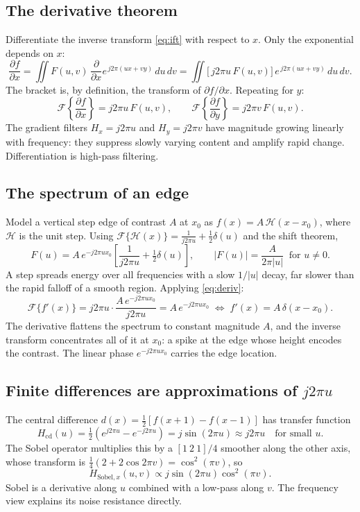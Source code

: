 \documentclass[11pt]{article}
\begin{document}
\subsection{The derivative theorem}
Differentiate the inverse transform \eqref{eq:ift} with respect to $x$. Only the exponential depends on $x$:
\[
\frac{\partial f}{\partial x}=\iint F(u,v)\,\frac{\partial}{\partial x}e^{\,j2\pi(ux+vy)}\,du\,dv
=\iint \big[\,j2\pi u\,F(u,v)\big]\,e^{\,j2\pi(ux+vy)}\,du\,dv .
\]
The bracket is, by definition, the transform of $\partial f/\partial x$. Repeating for $y$:
\begin{equation}
\mathcal{F}\!\left\{\frac{\partial f}{\partial x}\right\}=j2\pi u\,F(u,v),\qquad
\mathcal{F}\!\left\{\frac{\partial f}{\partial y}\right\}=j2\pi v\,F(u,v). \label{eq:deriv}
\end{equation}
The gradient filters $H_x=j2\pi u$ and $H_y=j2\pi v$ have magnitude growing linearly with frequency: they suppress slowly varying content and amplify rapid change. Differentiation is high-pass filtering.

\subsection{The spectrum of an edge}
Model a vertical step edge of contrast $A$ at $x_0$ as $f(x)=A\,\mathcal{H}(x-x_0)$, where $\mathcal{H}$ is the unit step. Using $\mathcal{F}\{\mathcal{H}(x)\}=\frac{1}{j2\pi u}+\frac12\delta(u)$ and the shift theorem,
\begin{equation}
F(u)=A\,e^{-j2\pi u x_0}\left[\frac{1}{j2\pi u}+\tfrac12\delta(u)\right],
\qquad |F(u)|=\frac{A}{2\pi|u|}\ \text{ for } u\neq 0 . \label{eq:step}
\end{equation}
A step spreads energy over all frequencies with a slow $1/|u|$ decay, far slower than the rapid falloff of a smooth region. Applying \eqref{eq:deriv}:
\[
\mathcal{F}\{f'(x)\}=j2\pi u\cdot\frac{A\,e^{-j2\pi u x_0}}{j2\pi u}=A\,e^{-j2\pi u x_0}
\;\Longleftrightarrow\; f'(x)=A\,\delta(x-x_0).
\]
The derivative flattens the spectrum to constant magnitude $A$, and the inverse transform concentrates all of it at $x_0$: a spike at the edge whose height encodes the contrast. The linear phase $e^{-j2\pi u x_0}$ carries the edge location.

\subsection{\texorpdfstring{Finite differences are approximations of $j2\pi u$}{Finite differences approximate j2 pi u}}
The central difference $d(x)=\tfrac12[f(x+1)-f(x-1)]$ has transfer function
\[
H_{\text{cd}}(u)=\tfrac12\left(e^{j2\pi u}-e^{-j2\pi u}\right)=j\sin(2\pi u)\approx j2\pi u\quad\text{for small }u .
\]
The Sobel operator multiplies this by a $[1\ 2\ 1]/4$ smoother along the other axis, whose transform is $\tfrac14(2+2\cos 2\pi v)=\cos^2(\pi v)$, so
\begin{equation}
H_{\text{Sobel},x}(u,v)\propto j\sin(2\pi u)\cos^2(\pi v).
\end{equation}
Sobel is a derivative along $u$ combined with a low-pass along $v$. The frequency view explains its noise resistance directly.
\end{document}
